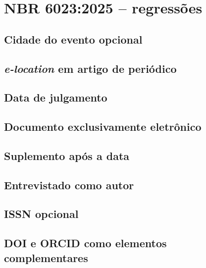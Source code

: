 \documentclass[a4paper]{article}
\begin{document}
\section*{NBR 6023:2025 -- regressões}

\subsection*{Cidade do evento opcional}

\nocite{event-without-venue,event-with-venue}
\printbibliography[
  heading=none,
  type=proceedings,
]

\subsection*{\textit{e-location} em artigo de periódico}

\nocite{article-with-elocation}
\printbibliography[
  heading=none,
  type=article,
  keyword=elocation,
]

\subsection*{Data de julgamento}

\nocite{judgment-with-date}
\printbibliography[
  heading=none,
  type=jurisdiction,
]

\subsection*{Documento exclusivamente eletrônico}

\nocite{exclusively-electronic,unknown-print-publication}
\printbibliography[
  heading=none,
  type=book,
]

\subsection*{Suplemento após a data}

\nocite{periodical-supplement}
\printbibliography[
  heading=none,
  keyword=supplement,
]

\subsection*{Entrevistado como autor}

\nocite{interview-with-interviewee-as-author}
\printbibliography[
  heading=none,
  keyword=interview,
]

\subsection*{ISSN opcional}

\nocite{periodical-with-issn,periodical-without-issn}
\printbibliography[
  heading=none,
  type=periodical,
]

\subsection*{DOI e ORCID como elementos complementares}

\nocite{article-with-doi-and-orcid}
\printbibliography[
  heading=none,
  keyword=identifiers,
]
\end{document}
